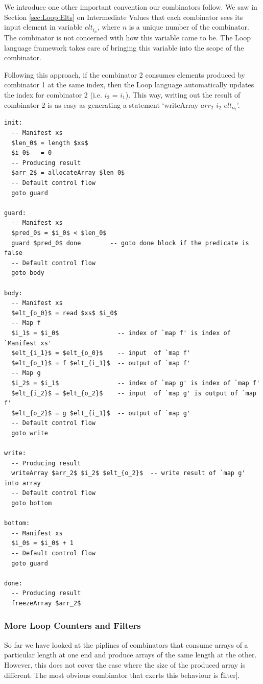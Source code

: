 \documentclass[preamble.tex]{subfiles}
\begin{document}
We introduce one other important convention our combinators follow. We saw in Section \ref{sec:Loop:Elts} on Intermediate Values that each combinator sees its input element in variable $elt_{i_n}$, where $n$ is a unique number of the combinator. The combinator is not concerned with how this variable came to be. The Loop language framework takes care of bringing this variable into the scope of the combinator.

Following this approach, if the combinator 2 consumes elements produced by combinator 1 at the same index, then the Loop language automatically updates the index for combinator 2 (i.e. $i_2$ = $i_1$). This way, writing out the result of combinator 2 is as easy as generating a statement `writeArray $arr_2$ $i_2$ $elt_{o_2}$'.

\begin{lstlisting}[mathescape]
init:
  -- Manifest xs
  $len_0$ = length $xs$
  $i_0$   = 0
  -- Producing result
  $arr_2$ = allocateArray $len_0$
  -- Default control flow
  goto guard

guard:
  -- Manifest xs
  $pred_0$ = $i_0$ < $len_0$
  guard $pred_0$ done        -- goto done block if the predicate is false
  -- Default control flow
  goto body

body:
  -- Manifest xs
  $elt_{o_0}$ = read $xs$ $i_0$
  -- Map f
  $i_1$ = $i_0$                -- index of `map f' is index of `Manifest xs'
  $elt_{i_1}$ = $elt_{o_0}$    -- input  of `map f'
  $elt_{o_1}$ = f $elt_{i_1}$  -- output of `map f'
  -- Map g
  $i_2$ = $i_1$                -- index of `map g' is index of `map f'
  $elt_{i_2}$ = $elt_{o_2}$    -- input  of `map g' is output of `map f'
  $elt_{o_2}$ = g $elt_{i_1}$  -- output of `map g'
  -- Default control flow
  goto write

write:
  -- Producing result
  writeArray $arr_2$ $i_2$ $elt_{o_2}$  -- write result of `map g' into array
  -- Default control flow
  goto bottom

bottom:
  -- Manifest xs
  $i_0$ = $i_0$ + 1
  -- Default control flow
  goto guard

done:
  -- Producing result
  freezeArray $arr_2$
\end{lstlisting}


\subsubsection{\label{sec:Loop:Filt}More Loop Counters and Filters}

So far we have looked at the piplines of combinators that consume arrays of a particular length at one end and produce arrays of the same length at the other. However, this does not cover the case where the size of the produced array is different. The most obvious combinator that exerts this behaviour is \|filter|.
\end{document}
